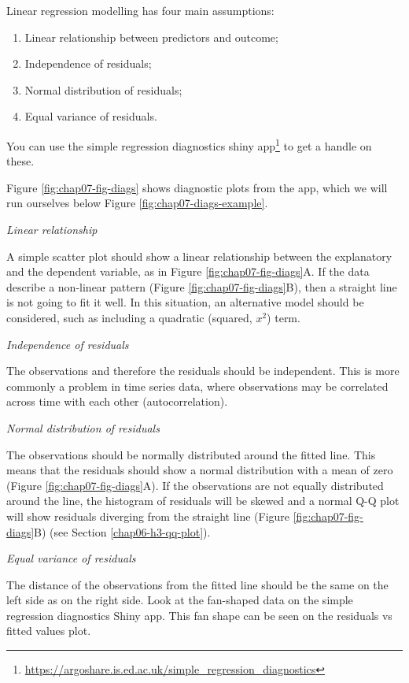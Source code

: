 \documentclass[
  12pt,
  krantz2]{krantz}
\providecommand{\tightlist}{%
  \setlength{\itemsep}{0pt}\setlength{\parskip}{0pt}}
\renewcommand{\href}[2]{#2\footnote{\url{#1}}}
\begin{document}
Linear regression modelling has four main assumptions:

\begin{enumerate}
\def\labelenumi{\arabic{enumi}.}
\tightlist
\item
  Linear relationship between predictors and outcome;
\item
  Independence of residuals;
\item
  Normal distribution of residuals;
\item
  Equal variance of residuals.
\end{enumerate}

You can use the \href{https://argoshare.is.ed.ac.uk/simple_regression_diagnostics}{simple regression diagnostics shiny app} to get a handle on these.

Figure \ref{fig:chap07-fig-diags} shows diagnostic plots from the app, which we will run ourselves below Figure \ref{fig:chap07-diags-example}.

\emph{Linear relationship}

A simple scatter plot should show a linear relationship between the explanatory and the dependent variable, as in Figure \ref{fig:chap07-fig-diags}A.
If the data describe a non-linear pattern (Figure \ref{fig:chap07-fig-diags}B), then a straight line is not going to fit it well.
In this situation, an alternative model should be considered, such as including a quadratic (squared, \(x^2\)) term.

\emph{Independence of residuals}

The observations and therefore the residuals should be independent.
This is more commonly a problem in time series data, where observations may be correlated across time with each other (autocorrelation).

\emph{Normal distribution of residuals}

The observations should be normally distributed around the fitted line.
This means that the residuals should show a normal distribution with a mean of zero (Figure \ref{fig:chap07-fig-diags}A).
If the observations are not equally distributed around the line, the histogram of residuals will be skewed and a normal Q-Q plot will show residuals diverging from the straight line (Figure \ref{fig:chap07-fig-diags}B) (see Section \ref{chap06-h3-qq-plot}).

\emph{Equal variance of residuals}

The distance of the observations from the fitted line should be the same on the left side as on the right side.
Look at the fan-shaped data on the simple regression diagnostics Shiny app.
This fan shape can be seen on the residuals vs fitted values plot.
\end{document}
